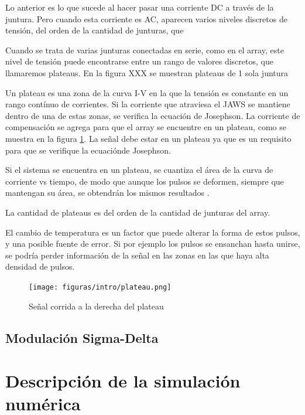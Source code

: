 \documentclass[twoside]{article}
\begin{document}
\begin{multicols}{2}
Lo anterior es lo que sucede al hacer pasar una corriente DC a través de la juntura. Pero cuando esta corriente es AC, aparecen varios niveles discretos de tensión, del orden de la cantidad de junturas, que 

Cuando se trata de varias junturas conectadas en serie, como en el array, este nivel de tensión puede encontrarse entre un rango de valores discretos, que llamaremos plateaus. En la figura XXX se muestran plateaus de 1 sola juntura



Un plateau es una zona de la curva I-V en la que la tensión es constante en un rango contínuo de corrientes. Si la corriente que atraviesa el JAWS se mantiene dentro de una de estas zonas, se verifica la ecuación de Josephson.
La corriente de compensación se agrega para que el array se encuentre en un plateau, como se muestra en la figura \ref{fig:intro_plateau}. La señal debe estar en un plateau ya que es un requisito para que se verifique la ecuaciónde Josephson.

Si el sistema se encuentra en un plateau, se cuantiza el área de la curva de corriente vs tiempo, de modo que aunque los pulsos se deformen, siempre que mantengan su área, se obtendrán los mismos resultados \cite{benz1998}. 

La cantidad de plateaus es del orden de la cantidad de junturas del array. %

El cambio de temperatura es un factor que puede alterar la forma de estos pulsos, y una posible fuente de error. Si por ejemplo los pulsos se ensanchan hasta unirse, se podría perder información de la señal en las zonas en las que haya alta densidad de pulsos.



\begin{figure}[H]
    \centering
    \texttt{[image: figuras/intro/plateau.png]}
    \caption{Señal corrida a la derecha del plateau}
    \label{fig:intro_plateau}
\end{figure}

\subsection{Modulación Sigma-Delta}



\section{Descripción de la simulación numérica}


\end{multicols}
\end{document}
